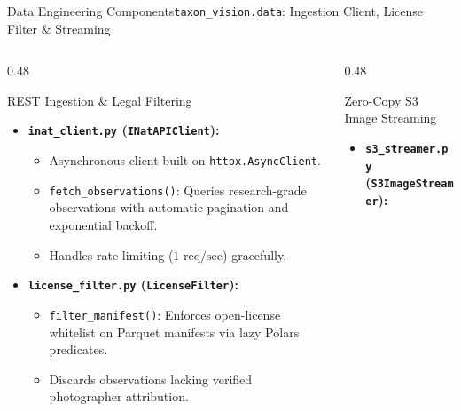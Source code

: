 \begin{frame}{Data Engineering Components}{\texttt{taxon\_vision.data}: Ingestion Client, License Filter \& Streaming}
    \begin{columns}[T]
        \begin{column}{0.48\textwidth}
            \begin{block}{REST Ingestion \& Legal Filtering}
                \begin{itemize}\scriptsize
                    \item \textbf{\texttt{inat\_client.py} (\texttt{INatAPIClient}):}
                        \begin{itemize}\tiny
                            \item Asynchronous client built on \texttt{httpx.AsyncClient}.
                            \item \texttt{fetch\_observations()}: Queries research-grade observations with automatic pagination and exponential backoff.
                            \item Handles rate limiting ($1\text{ req/sec}$) gracefully.
                        \end{itemize}
                    \item \textbf{\texttt{license\_filter.py} (\texttt{LicenseFilter}):}
                        \begin{itemize}\tiny
                            \item \texttt{filter\_manifest()}: Enforces open-license whitelist on Parquet manifests via lazy Polars predicates.
                            \item Discards observations lacking verified photographer attribution.
                        \end{itemize}
                \end{itemize}
            \end{block}
        \end{column}
        \begin{column}{0.48\textwidth}
            \begin{block}{Zero-Copy S3 Image Streaming}
                \begin{itemize}\scriptsize
                    \item \textbf{\texttt{s3\_streamer.py} (\texttt{S3ImageStreamer}):}

\end{itemize}
\end{block}
\end{column}
\end{columns}
\end{frame}
